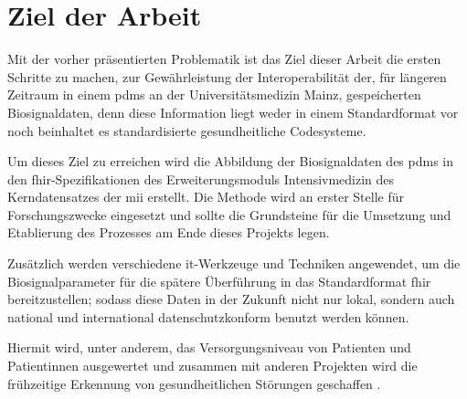 \section{Ziel der Arbeit} \label{sec:goal}

Mit der vorher präsentierten Problematik ist das Ziel dieser Arbeit die ersten Schritte zu machen, zur Gewährleistung der Interoperabilität der, für längeren Zeitraum in einem \ac{pdms} an der Universitätsmedizin Mainz, gespeicherten Biosignaldaten, denn diese Information liegt weder in einem Standardformat vor noch beinhaltet es standardisierte gesundheitliche Codesysteme. 

Um dieses Ziel zu erreichen wird die Abbildung der Biosignaldaten des \ac{pdms} in den \ac{fhir}-Spezifikationen des Erweiterungsmoduls \glqq Intensivmedizin\grqq{} des Kerndatensatzes der \ac{mii} erstellt. Die Methode wird an erster Stelle für Forschungszwecke eingesetzt und sollte die Grundsteine für die Umsetzung und Etablierung des Prozesses am Ende dieses Projekts legen. 

Zusätzlich werden verschiedene \ac{it}-Werkzeuge und Techniken angewendet, um die Biosignalparameter für die spätere Überführung in das Standardformat \ac{fhir} bereitzustellen; sodass diese Daten in der Zukunft nicht nur lokal, sondern auch national und international datenschutzkonform benutzt werden können. 

Hiermit wird, unter anderem, das Versorgungsniveau von Patienten und Patientinnen ausgewertet und zusammen mit anderen Projekten wird die frühzeitige Erkennung von gesundheitlichen Störungen geschaffen \cite{icukdz}.